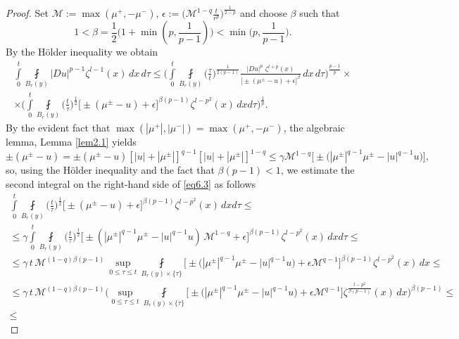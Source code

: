 \documentclass[a4paper,11pt,fullpage]{article}
\numberwithin{equation}{section}
\begin{document}
\begin{proof}
Set $\mathcal{M}:=\max(\mu^+, -\mu^-)$, $\epsilon:=\big(\mathcal{M}^{1-q}\frac{t}{r^p}\big)^{\frac{1}{2-p}}$ and choose  $\beta$ such that
$$1<\beta=\frac{1}{2}\big(1+\min (p, \frac{1}{p-1})\big) <\min\big(p, \frac{1}{p-1}\big).$$
By the H\"{o}lder inequality we obtain
\begin{multline}\label{eq6.3}
\int\limits^t_0\fint\limits_{B_{r}(y)}|D u|^{p-1} \zeta^{l-1}(x)\,dx\,d\tau\leqslant
\bigg(\int\limits^t_0\fint\limits_{B_{r}(y)}\Big(\frac{\tau}{t}\Big)^{\frac{1}{2(p-1)}} \frac{|D u|^{p}\,\,\zeta^{l+p}(x)}{\big[\pm(\mu^{\pm}-u)+\epsilon\big]^{\beta}} \,dx\,d\tau\bigg)^{\frac{p-1}{p}}\times\\\times
\bigg(\int\limits^t_0\fint\limits_{B_{r}(y)}\Big(\frac{t}{\tau}\Big)^{\frac{1}{2}}\Big[\pm(\mu^{\pm}-u)+\epsilon\Big]^
{\beta (p-1)}\zeta^{l-p^2}(x)\,dx d\tau\bigg)^{\frac{1}{p}}.
\end{multline}
By the evident fact that $\max(|\mu^+|, |\mu^-|)=\max(\mu^+, -\mu^-)$, the algebraic lemma, Lemma \ref{lem2.1} yields
\begin{equation}\label{eq6.4}
\pm(\mu^{\pm}-u)=\pm(\mu^{\pm}-u)[|u|+|\mu^{\pm}|]^{q-1}[|u|+|\mu^{\pm}|]^{1-q}\leqslant \gamma \mathcal{M}^{1-q}\big[\pm\big(|\mu^{\pm}|^{q-1}\mu^{\pm}-|u|^{q-1}u\big)\big],
\end{equation}
so, using the H\"{o}lder inequality and the fact that $\beta (p-1)< 1$,
we estimate the second integral on the right-hand side of \eqref{eq6.3} as follows
\begin{multline}\label{eq6.5}
\int\limits^t_0\fint\limits_{B_{ r}(y)}\Big(\frac{t}{\tau}\Big)^{\frac{1}{2}}\Big[\pm(\mu^{\pm}-u)+\epsilon\Big]^{\beta(p-1)}\zeta^{l-p^2}(x)\,dx d\tau\leqslant\\
\leqslant\gamma \int\limits^t_0\fint\limits_{B_{r}(y)}\Big(\frac{t}{\tau}\Big)^{\frac{1}{2}}\Big[\pm(|\mu^{\pm}|^{q-1}\mu^{\pm}-|u|^{q-1}u)\,
\mathcal{M}^{1-q}+\epsilon\Big]^{\beta(p-1)}\zeta^{l-p^2}(x)\,dx d\tau\leqslant\\\leqslant \gamma\, t\,\mathcal{M}^{(1-q)\beta(p-1)}\,\sup\limits_{0\leqslant \tau\leqslant t}\fint\limits_{B_{r}(y)\times\{\tau\}}
\Big[\pm\big(|\mu^{\pm}|^{q-1}\mu^{\pm}-|u|^{q-1}u\big)+\epsilon \mathcal{M}^{q-1}\Big]^{\beta(p-1)}\zeta^{l-p^2}(x)\,dx \leqslant\\
\leqslant \gamma\,t\,\mathcal{M}^{(1-q)\beta(p-1)}\bigg(\sup\limits_{0\leqslant \tau\leqslant t}\fint\limits_{B_{r}(y)\times\{\tau\}}
\Big[\pm\big(|\mu^{\pm}|^{q-1}\mu^{\pm}-|u|^{q-1}u\big)+\epsilon \mathcal{M}^{q-1}\Big]\zeta^{\frac{l-p^2}{\beta(p-1)}}(x)\,dx \bigg)^{\beta(p-1)}\leqslant\\\leqslant  

\end{multline}
\end{proof}
\end{document}
